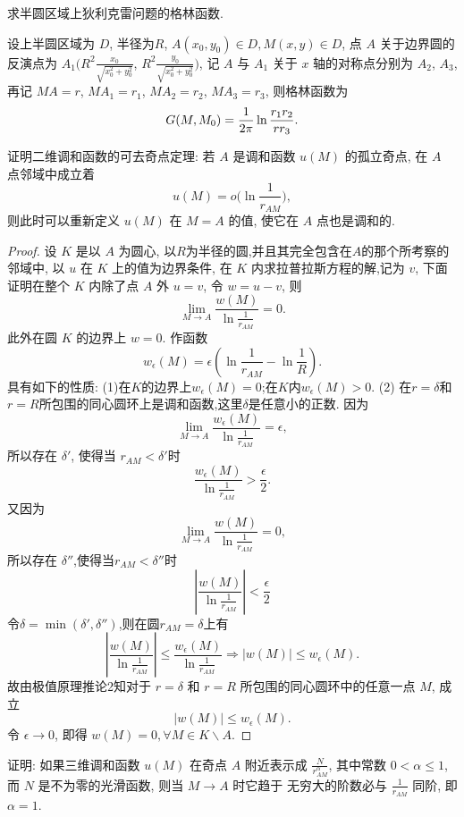 \begin{exercise}[5]
  求半圆区域上狄利克雷问题的格林函数.
\end{exercise}

\begin{solve}
  设上半圆区域为 $D$, 半径为$R$, $A(x_0,y_0)\in D,M(x,y)\in D$,
  点 $A$ 关于边界圆的反演点为 $A_1(R^2\frac{x_0}{\sqrt{x_0^2+y_0^2}}$,
  $R^2\frac{y_0}{\sqrt{x_0^2+y_0^2}})$,
  记 $A$ 与 $A_1$ 关于 $x$ 轴的对称点分别为 $A_2$, $A_3$,
  再记 $MA=r$, $MA_1=r_1$, $MA_2=r_2$, $MA_3=r_3$, 则格林函数为
  \[G(M,M_0)=\frac{1}{2\pi}\ln\frac{r_1r_2}{rr_3}.\qedhere\]
\end{solve}


\begin{exercise}[7]
  证明二维调和函数的可去奇点定理:
  若 $A$ 是调和函数 $u(M)$ 的孤立奇点, 在 $A$ 点邻域中成立着
  \[u(M) = o\biggl(\ln\frac{1}{r_{AM}}\biggr),\]
  则此时可以重新定义 $u(M)$ 在 $M=A$ 的值, 使它在 $A$ 点也是调和的.
\end{exercise}

\begin{proof}
  设 $K$ 是以 $A$ 为圆心, 以$R$为半径的圆,并且其完全包含在$A$的那个所考察的邻域中,
  以 $u$ 在 $K$ 上的值为边界条件, 在 $K$ 内求拉普拉斯方程的解,记为 $v$,
  下面证明在整个 $K$ 内除了点 $A$ 外 $u=v$, 令 $w=u-v$, 则
  \[\lim_{M\to A}\frac{w(M)}{\ln\frac{1}{r_{AM}}}=0.\]
  此外在圆 $K$ 的边界上 $w=0$. 作函数
  \[w_{\epsilon}(M) = \epsilon\left(\ln\frac{1}{r_{AM}}-\ln\frac{1}{R}\right).\]
  具有如下的性质: (1)在$K$的边界上$w_{\epsilon}(M)=0$;在$K$内$w_{\epsilon}(M)>0$.
  (2) 在$r=\delta$和$r=R$所包围的同心圆环上是调和函数,这里$\delta$是任意小的正数.
  因为
  \[\lim_{M\to A}\frac{w_{\epsilon}(M)}{\ln\frac{1}{r_{AM}}}=\epsilon,\]
  所以存在 $\delta'$, 使得当 $r_{AM}<\delta'$时
  \[\frac{w_{\epsilon}(M)}{\ln\frac{1}{r_{AM}}}>\frac{\epsilon}{2}.\]
  又因为
  \[\lim_{M\to A}\frac{w(M)}{\ln\frac{1}{r_{AM}}}=0,\]
  所以存在 $\delta''$,使得当$r_{AM}<\delta''$时
  \[\left|\frac{w(M)}{\ln\frac{1}{r_{AM}}}\right|<\frac{\epsilon}{2}\]
  令$\delta=\min(\delta',\delta'')$,则在圆$r_{AM}=\delta$上有
  \[\left|\frac{w(M)}{\ln\frac{1}{r_{AM}}}\right|
    \leq\frac{w_{\epsilon}(M)}{\ln\frac{1}{r_{AM}}}\Rightarrow|w(M)|\leq w_{\epsilon}(M).\]
  故由极值原理推论2知对于 $r=\delta$ 和 $r=R$ 所包围的同心圆环中的任意一点 $M$, 成立
  \[|w(M)|\leq w_{\epsilon}(M).\]
  令 $\epsilon\to0$, 即得 $w(M)=0,\forall M\in K\backslash A$.
\end{proof}


\begin{exercise}
  证明: 如果三维调和函数 $u(M)$ 在奇点 $A$ 附近表示成 $\frac{N}{r_{AM}^{\alpha}}$,
  其中常数 $0<\alpha\leq 1$, 而 $N$ 是不为零的光滑函数, 则当 $M\to A$ 时它趋于
  无穷大的阶数必与 $\frac{1}{r_{AM}}$ 同阶, 即 $\alpha=1$.
\end{exercise}

